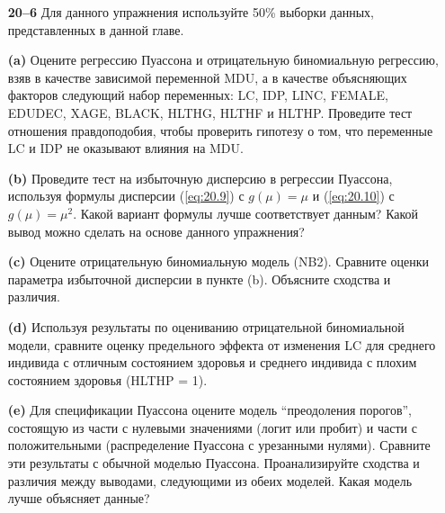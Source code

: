 \begin{itemize}
    \item[\textbf{20--6}]
Для данного упражнения используйте 50\% выборки данных, представленных в данной главе.
        \item[\textbf{(a)}]
Оцените регрессию Пуассона и отрицательную биномиальную регрессию, взяв в качестве зависимой переменной MDU, а в качестве объясняющих факторов следующий набор переменных: LC, IDP, LINC, FEMALE, EDUDEC, XAGE, BLACK, HLTHG, HLTHF и HLTHP. Проведите тест отношения правдоподобия, чтобы проверить гипотезу о том, что переменные LC и IDP не оказывают влияния на MDU.
        \item[\textbf{(b)}]
Проведите тест на избыточную дисперсию в регрессии Пуассона, используя формулы дисперсии (\ref{eq:20.9}) с $g(\mu) = \mu$ и (\ref{eq:20.10}) с $g(\mu) = \mu^2$. %
Какой вариант формулы лучше соответствует данным? Какой вывод можно сделать на основе данного упражнения?
        \item[\textbf{(c)}]
Оцените отрицательную биномиальную модель (NB2). Сравните оценки параметра избыточной дисперсии в пункте (b). Объясните сходства и различия.
        \item[\textbf{(d)}]
Используя результаты по оцениванию отрицательной биномиальной модели, сравните оценку предельного эффекта от изменения LC для среднего индивида с отличным состоянием здоровья и среднего индивида с плохим состоянием здоровья (HLTHP = 1).
        \item[\textbf{(e)}]
Для спецификации Пуассона оцените модель ``преодоления порогов'', состоящую из части с нулевыми значениями (логит или пробит) и части с положительными (распределение Пуассона с урезанными нулями). Сравните эти результаты с обычной моделью Пуассона. Проанализируйте сходства и различия между выводами, следующими из обеих моделей. Какая модель лучше объясняет данные?
\end{itemize}

